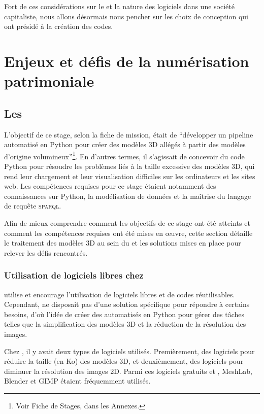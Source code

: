         Fort de ces considérations sur le \gco et la nature des logiciels dans une société capitaliste, nous allons désormais nous pencher sur les choix de conception qui ont présidé à la création des codes.
        
\chapter{Enjeux et défis de la numérisation patrimoniale}

        \section{Les }
        
        L'objectif de ce stage, selon la fiche de mission, était de \enquote{développer un pipeline automatisé en Python pour créer des modèles 3D allégés à partir des modèles d'origine volumineux}\footnote{Voir Fiche de Stages, dans les Annexes.}. En d'autres termes, il s'agissait de concevoir du code Python pour résoudre les problèmes liés à la taille excessive des modèles 3D, qui rend leur chargement et leur visualisation difficiles sur les ordinateurs et les sites web. Les compétences requises pour ce stage étaient notamment des connaissances sur Python, la modélisation de données et la maîtrise du langage de requête \textsc{sparql}.

        Afin de mieux comprendre comment les objectifs de ce stage ont été atteints et comment les compétences requises ont été mises en œuvre, cette section détaille le traitement des modèles 3D au sein du \dsc et les solutions mises en place pour relever les défis rencontrés.
        
            \subsection{Utilisation de logiciels libres chez \dsc}
            \dsc utilise et encourage l'utilisation de logiciels libres et de codes réutilisables. Cependant, \dsc ne disposait pas d'une solution spécifique pour répondre à certains besoins, d'où l'idée de créer des  automatisés en Python pour gérer des tâches telles que la simplification des modèles 3D et la réduction de la résolution des images.

            Chez \dsc, il y avait deux types de logiciels utilisés. Premièrement, des logiciels pour réduire la taille (en Ko) des modèles 3D, et deuxièmement, des logiciels pour diminuer la résolution des images 2D. Parmi ces logiciels gratuits et \opso, MeshLab, Blender et GIMP étaient fréquemment utilisés.
            
